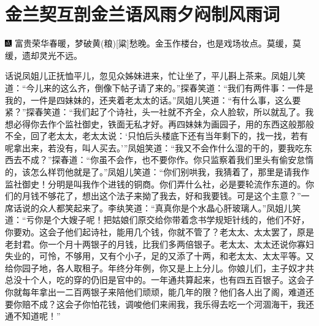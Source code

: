 

\chapter{金兰契互剖金兰语\hspace{.5em}风雨夕闷制风雨词}

{\includegraphics[width=3mm]{../Images/00005}  \kaishu 富贵荣华春暖，梦破黄{{(粮)}}{[}粱{]}愁晚。金玉作楼台，也是戏场妆点。莫缓，莫缓，遗却灵光不远。}

话说凤姐儿正抚恤平儿，忽见众姊妹进来，忙让坐了，平儿斟上茶来。凤姐儿笑道：“今儿来的这么齐，倒像下帖子请了来的。”探春笑道：“我们有两件事：一件是我的，一件是四妹妹的，还夹着老太太的话。”凤姐儿笑道：“有什么事，这么要紧？”探春笑道：“我们起了个诗社，头一社就不齐全，众人脸软，所以就乱了。我想必得你去作个监社御史，铁面无私才好。再四妹妹为画园子，用的东西这般那般不全，回了老太太，老太太说：‘只怕后头楼底下还有当年剩下的，找一找，若有呢拿出来，若没有，叫人买去。’”凤姐笑道：“我又不会作什么湿的干的，要我吃东西去不成？”探春道：“你虽不会作，也不要你作。你只监察着我们里头有偷安怠惰的，该怎么样罚他就是了。”凤姐儿笑道：“你们别哄我，我猜着了，那里是请我作监社御史！分明是叫我作个进钱的铜商。你们弄什么社，必是要轮流作东道的。你们的月钱不够花了，想出这个法子来拗了我去，好和我要钱。可是这个主意？”一席话说的众人都笑起来了。李纨笑道：“真真你是个水晶心肝玻璃人。”凤姐儿笑道：“亏你是个大嫂子呢！把姑娘们原交给你带着念书学规矩针线的，他们不好，你要劝。这会子他们起诗社，能用几个钱，你就不管了？老太太、太太罢了，原是老封君。你一个月十两银子的月钱，比我们多两倍银子。老太太、太太还说你寡妇失业的，可怜，不够用，又有个小子，足的又添了十两，和老太太、太太平等。又给你园子地，各人取租子。年终分年例，你又是上上分儿。你娘儿们，主子奴才共总没十个人，吃的穿的仍旧是官中的。一年通共算起来，也有四五百银子。这会子你就每年拿出一二百两银子来陪他们顽顽，能几年的限？他们各人出了阁，难道还要你赔不成？这会子你怕花钱，调唆他们来闹我，我乐得去吃一个河涸海干，我还通不知道呢！”

